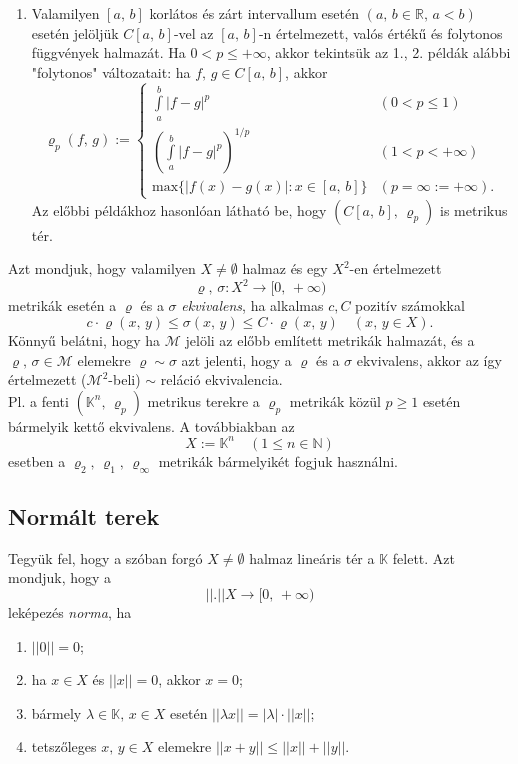 \documentclass[12pt]{article}
\newcommand{\R}{\mathbb{R}}
\newcommand{\N}{\mathbb{N}}
\newcommand{\K}{\mathbb{K}}
\begin{document}
\begin{enumerate}
        \item Valamilyen $[a, \, b]$ korlátos és zárt intervallum esetén $(a, \, b \in \R, \, a < b)$ esetén jelöljük $C[a, \, b]$-vel az $[a, \, b]$-n értelmezett, valós értékű és folytonos függvények halmazát. Ha $0 < p \leq + \infty$, akkor tekintsük az 1., 2. példák alábbi "folytonos" változatait: ha $f, \, g \in C[a, \, b]$, akkor
        \[
            \varrho_p(f, \, g) :=
            \begin{cases}
                \displaystyle \int\limits_a^b |f-g|^p & (0 < p \leq 1) \\
                \displaystyle \left( \int\limits_a^b |f-g|^p \right)^{1/p} & (1 < p < + \infty) \\
                \text{max}\{ |f(x) - g(x)| : x \in [a, \, b] \} & (p = \infty := + \infty).
            \end{cases}
        \]
        Az előbbi példákhoz hasonlóan látható be, hogy $(C[a, \, b], \, \varrho_p)$ is metrikus tér.
    \end{enumerate}

    Azt mondjuk, hogy valamilyen $X \neq \emptyset$ halmaz és egy $X^2$-en értelmezett
    \[
        \varrho, \, \sigma : X^2 \to [0, \, +\infty)
    \]
    metrikák esetén a $\varrho$ és a $\sigma$ \textit{ekvivalens}, ha alkalmas $c, C$ pozitív számokkal
    \[
        c \cdot \varrho(x, \, y) \leq \sigma(x, \, y) \leq C \cdot \varrho(x, \, y) \quad (x, \, y \in X).
    \]
    Könnyű belátni, hogy ha $\mathcal{M}$ jelöli az előbb említett metrikák halmazát, és a $\varrho, \, \sigma \in \mathcal{M}$ elemekre $\varrho \sim \sigma$ azt jelenti, hogy a $\varrho$ és a $\sigma$ ekvivalens, akkor az így értelmezett ($\mathcal{M}^2$-beli) $\sim$ reláció ekvivalencia.\\

    Pl. a fenti $(\K^n, \, \varrho_p)$ metrikus terekre a $\varrho_p$ metrikák közül $p \geq 1$ esetén bármelyik kettő ekvivalens. A továbbiakban az
    \[
        X := \K^n \quad (1 \leq n \in \N)
    \]
    esetben a $\varrho_2, \, \varrho_1, \, \varrho_\infty$ metrikák bármelyikét fogjuk használni.

    \subsection{Normált terek}
    Tegyük fel, hogy a szóban forgó $X \neq \emptyset$ halmaz lineáris tér a $\K$ felett. Azt mondjuk, hogy a
    \[
        ||.|| X \to [0, \, + \infty)
    \]
    leképezés \textit{norma}, ha
    \begin{enumerate}
        \item $||0|| = 0$;
        \item ha $x \in X$ és $||x|| = 0$, akkor $x = 0$;
        \item bármely $\lambda \in \K, \, x \in X$ esetén $||\lambda x|| = |\lambda| \cdot ||x||$;
        \item tetszőleges $x, \, y \in X$ elemekre $||x+y|| \leq ||x|| + ||y||$.
    \end{enumerate}
\end{document}

